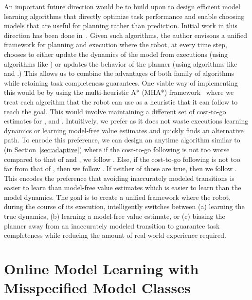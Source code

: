 An important future direction would be to build upon \taml{} to design
efficient model learning algorithms that directly optimize task
performance and enable choosing models that are useful for planning
rather than prediction. Initial work in this direction has been done
in~\cite{grimm2020value, DBLP:journals/corr/abs-2106-10316,
  DBLP:conf/icml/AyoubJSWY20, DBLP:journals/corr/abs-2106-14080,
  DBLP:journals/corr/abs-2106-03273,
  DBLP:journals/corr/abs-2110-02758}.
Given such algorithms, the author envisons a
unified framework for planning and execution where the robot, at every
time step, chooses to either update the dynamics of the model from
executions (using algorithms like \taml{}) or updates the behavior of
the planner (using algorithms like \cmax{} and \cmaxpp{}.) This allows
us to combine the advantages of both family of algorithms while
retaining task completeness guarantees. One viable way of implementing
this would be by using the multi-heuristic A* (MHA*)
framework~\cite{DBLP:journals/ijrr/AineSNHL16} where we treat each
algorithm that the robot can use as a heuristic that it can follow to
reach the goal. This would involve maintaining a different set of
cost-to-go estimates for \taml{}, \cmax{} and \cmaxpp{}. Intuitively,
we prefer \cmax{} as it does not waste executions learning dynamics or
learning model-free value estimates and quickly finds an alternative
path. To encode this preference, we can design an anytime algorithm
similar to \acmaxpp{} (in Section~\ref{sec:adaptive}) where if the
cost-to-go following \cmax{} is not too worse compared to that of
\taml{} and \cmaxpp{}, we follow \cmax{}. Else, if the cost-to-go
following \cmaxpp{} is not too far from that of \taml{}, then we
follow \cmaxpp{}. If neither of those are true, then we follow
\taml{}. This encodes the preference that avoiding inaccurately
modeled transitions is easier to learn than model-free value
estimates which is easier to learn than the model dynamics. The goal is to create a unified
framework where the robot, during the course of its execution,
intelligently switches between (a) learning the true dynamics, (b)
learning a model-free value estimate, or (c)
biasing the planner away from an inaccurately modeled
transition to guarantee task completeness while reducing
the amount of real-world experience required.


\section{Online Model Learning with Misspecified Model Classes}
\label{sec:online-model-learn}

